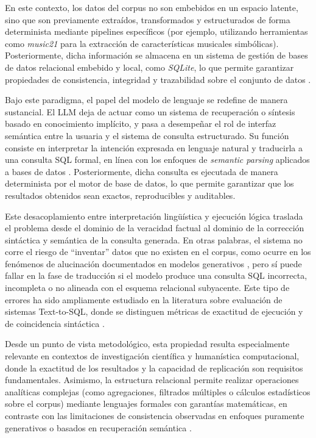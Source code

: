 En este contexto, los datos del corpus no son embebidos en un espacio latente, sino que son previamente extraídos, transformados y estructurados de forma determinista mediante pipelines específicos (por ejemplo, utilizando herramientas como \textit{music21} para la extracción de características musicales simbólicas). Posteriormente, dicha información se almacena en un sistema de gestión de bases de datos relacional embebido y local, como \textit{SQLite}, lo que permite garantizar propiedades de consistencia, integridad y trazabilidad sobre el conjunto de datos \citep{sqlite, cuthbert2010music21}.

Bajo este paradigma, el papel del modelo de lenguaje se redefine de manera sustancial. El LLM deja de actuar como un sistema de recuperación o síntesis basado en conocimiento implícito, y pasa a desempeñar el rol de interfaz semántica entre la usuaria y el sistema de consulta estructurado. Su función consiste en interpretar la intención expresada en lenguaje natural y traducirla a una consulta SQL formal, en línea con los enfoques de \textit{semantic parsing} aplicados a bases de datos \citep{lehman2022building, zhong2017seq2sql}. Posteriormente, dicha consulta es ejecutada de manera determinista por el motor de base de datos, lo que permite garantizar que los resultados obtenidos sean exactos, reproducibles y auditables.

Este desacoplamiento entre interpretación lingüística y ejecución lógica traslada el problema desde el dominio de la veracidad factual al dominio de la corrección sintáctica y semántica de la consulta generada. En otras palabras, el sistema no corre el riesgo de “inventar” datos que no existen en el corpus, como ocurre en los fenómenos de alucinación documentados en modelos generativos \citep{huang2023citation}, pero sí puede fallar en la fase de traducción si el modelo produce una consulta SQL incorrecta, incompleta o no alineada con el esquema relacional subyacente. Este tipo de errores ha sido ampliamente estudiado en la literatura sobre evaluación de sistemas Text-to-SQL, donde se distinguen métricas de exactitud de ejecución y de coincidencia sintáctica \citep{yu2018spider}.

Desde un punto de vista metodológico, esta propiedad resulta especialmente relevante en contextos de investigación científica y humanística computacional, donde la exactitud de los resultados y la capacidad de replicación son requisitos fundamentales. Asimismo, la estructura relacional permite realizar operaciones analíticas complejas (como agregaciones, filtrados múltiples o cálculos estadísticos sobre el corpus) mediante lenguajes formales con garantías matemáticas, en contraste con las limitaciones de consistencia observadas en enfoques puramente generativos o basados en recuperación semántica \citep{gao2023ragsurvey}.

